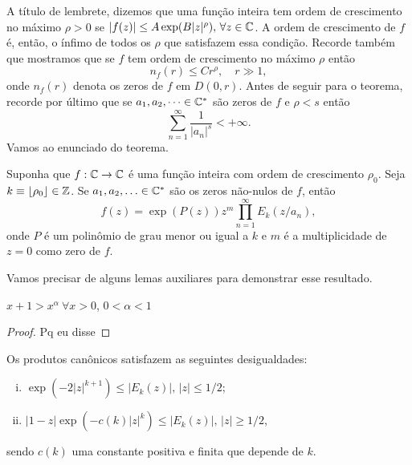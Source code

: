    A título de lembrete, dizemos que uma função inteira tem ordem de crescimento no máximo
    $\rho > 0$ se $|f(z)| \leq A\exp(B|z|^{\rho}), \, \forall z\in\mathbb{C}$. A ordem de 
    crescimento de $f$ é, então, o ínfimo de todos os $\rho$ que satisfazem essa
    condição. Recorde também que mostramos que se $f$ tem ordem de crescimento no
    máximo $\rho$ então
    \[
        n_f(r) \leq Cr^{\rho}, \quad r \gg 1,
    \]
    onde $n_f(r)$ denota os zeros de $f$ em $D(0, r)$. Antes de seguir para o teorema, 
    recorde por último que se $a_1, a_2, \dots \in\mathbb{C}^*$ são zeros de $f$ e $\rho < s$
    então
    \[
        \sum_{n=1}^{\infty} \frac{1}{|a_n|^s} < +\infty.
    \]
    Vamos ao enunciado do teorema.
    \begin{teorema}
    \label{teo:fatoracao-hadamard}
        Suponha que $f:\mathbb{C}\to\mathbb{C}$ é uma função inteira com ordem de crescimento $\rho_0$.
        Seja $k\equiv \lfloor \rho_0 \rfloor \in \mathbb{Z}$. 
        Se $a_1, a_2, \ldots \in\mathbb{C}^*$ são os 
        zeros não-nulos de $f$, então
        \[
            f(z) = \exp(P(z))z^m\prod_{n=1}^{\infty} E_k(z/a_n),
        \]
        onde $P$ é um polinômio de grau menor ou igual a $k$ e $m$ é a multiplicidade
        de $z=0$ como zero de $f$.
    \end{teorema}
    Vamos precisar de alguns lemas auxiliares para demonstrar esse resultado.
    \begin{lema}
    \label{lema:majoracao}
        $x+1 > x^\alpha \ \forall x>0$, 
        $0 < \alpha < 1$
    \end{lema}
    \begin{proof}
        Pq eu disse
    \end{proof}
    \begin{lema}
    \label{lema:5.2-Stein}
        Os produtos canônicos satisfazem as seguintes desigualdades:
        \begin{enumerate}[i)]
            \item $\exp( -2|z|^{k+1} ) \leq |E_k(z)|, \, |z| \leq 1/2$;
            \item $|1 - z|\exp( -c(k)|z|^k ) \leq |E_k(z)|, \, |z| \geq 1/2$,
        \end{enumerate}
        sendo $c(k)$ uma constante positiva e finita que depende de $k$.
    \end{lema}

